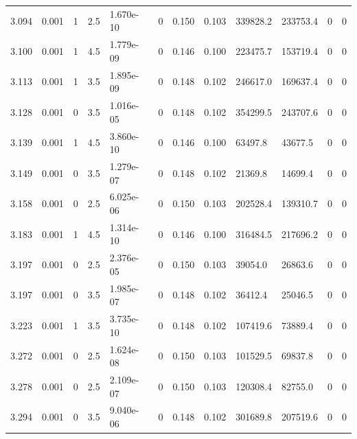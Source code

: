 \documentclass[preview]{standalone}
\begin{document}
{{{{{{{\begin{tabular}{L{1.2cm}C{1.2cm} C{0.3cm}C{0.5cm} C{1.4cm}C{1.4cm} C{1.4cm}C{1.4cm} C{1.6cm}C{1.6cm} C{1.6cm}C{1.6cm}}
  3.094  &  0.001  & 1     & 2.5 &  1.670e-10  & 0  &  0.150&   0.103& 339828.2 & 233753.4   &  0 & 0  \\ 
  3.100  &  0.001  & 1     & 4.5 &  1.779e-09  & 0  &  0.146&   0.100& 223475.7 & 153719.4   &  0 & 0  \\ 
  3.113  &  0.001  & 1     & 3.5 &  1.895e-09  & 0  &  0.148&   0.102& 246617.0 & 169637.4   &  0 & 0  \\ 
  3.128  &  0.001  & 0     & 3.5 &  1.016e-05  & 0  &  0.148&   0.102& 354299.5 & 243707.6   &  0 & 0  \\ 
  3.139  &  0.001  & 1     & 4.5 &  3.860e-10  & 0  &  0.146&   0.100& 63497.8 & 43677.5   &  0 & 0  \\ 
  3.149  &  0.001  & 0     & 3.5 &  1.279e-07  & 0  &  0.148&   0.102& 21369.8 & 14699.4   &  0 & 0  \\ 
  3.158  &  0.001  & 0     & 2.5 &  6.025e-06  & 0  &  0.150&   0.103& 202528.4 & 139310.7   &  0 & 0  \\ 
  3.183  &  0.001  & 1     & 4.5 &  1.314e-10  & 0  &  0.146&   0.100& 316484.5 & 217696.2   &  0 & 0  \\ 
  3.197  &  0.001  & 0     & 2.5 &  2.376e-05  & 0  &  0.150&   0.103& 39054.0 & 26863.6   &  0 & 0  \\ 
  3.197  &  0.001  & 0     & 3.5 &  1.985e-07  & 0  &  0.148&   0.102& 36412.4 & 25046.5   &  0 & 0  \\ 
  3.223  &  0.001  & 1     & 3.5 &  3.735e-10  & 0  &  0.148&   0.102& 107419.6 & 73889.4   &  0 & 0  \\ 
  3.272  &  0.001  & 0     & 2.5 &  1.624e-08  & 0  &  0.150&   0.103& 101529.5 & 69837.8   &  0 & 0  \\ 
  3.278  &  0.001  & 0     & 2.5 &  2.109e-07  & 0  &  0.150&   0.103& 120308.4 & 82755.0   &  0 & 0  \\ 
  3.294  &  0.001  & 0     & 3.5 &  9.040e-06  & 0  &  0.148&   0.102& 301689.8 & 207519.6   &  0 & 0  \\ 
\hline 
\end{tabular} 

}}}}}}}
\end{document}
